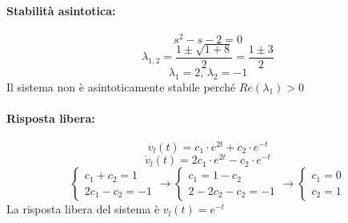 \documentclass[a4paper,oneside,titlepage]{book}
\begin{document}
\paragraph{Stabilità asintotica:}
\[ s^2 - s - 2 = 0 \]
\[ \lambda_{1,2} = \frac{1 \pm \sqrt{1 + 8}}{2} = \frac{1 \pm 3}{2}\]
\[ \lambda_1 = 2, \, \lambda_2 = -1 \]
Il sistema non è asintoticamente stabile perché $Re(\lambda_1)>0$

\paragraph{Risposta libera:}
\[ v_l(t) = c_1 \cdot e^{2t} + c_2 \cdot e^{-t} \]
\[ \dot{v}_l(t) = 2c_1 \cdot e^{2t} - c_2 \cdot e^{-t} \]
\[
\begin{cases}
c_1 + c_2 = 1 \\
2c_1 - c_2 = -1
\end{cases}
\longrightarrow
\begin{cases}
c_1 = 1 - c_2 \\
2 - 2c_2 - c_2 = -1
\end{cases}
\longrightarrow
\begin{cases}
c_1 = 0 \\
c_2 = 1
\end{cases}
\]
La risposta libera del sistema è $v_l(t) = e^{-t}$
\end{document}
